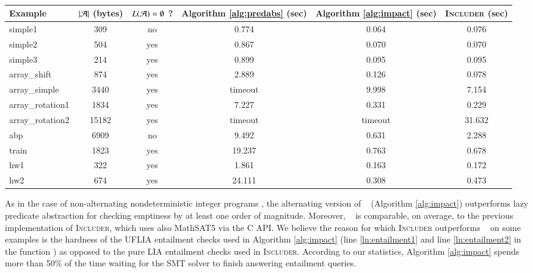 \documentclass[10pt]{llncs}
\begin{document}
\begin{table}[htb]
\vspace*{-\baselineskip}
\begin{center}
{\fontsize{8}{9}\selectfont
\begin{tabular}{||l|c|c|c|c|c||}
\hline
Example & ${|{\mathcal{A}}|}$ (bytes) & $L(\mathcal{A})=\emptyset$ ? & Algorithm \ref{alg:predabs} (sec) & Algorithm \ref{alg:impact} (sec) & \textsc{Includer} (sec) \\
\hline
simple1 & 309 & no & 0.774 & 0.064 & 0.076\\
\hline
simple2 & 504 & yes & 0.867 & 0.070 & 0.070\\
\hline
simple3 & 214 & yes & 0.899 & 0.095 & 0.095\\
\hline
array\_shift & 874 & yes & 2.889 & 0.126 & 0.078\\
\hline
array\_simple & 3440 & yes & timeout & 9.998 & 7.154\\
\hline
array\_rotation1 & 1834 & yes & 7.227 & 0.331 & 0.229\\
\hline
array\_rotation2 & 15182 & yes & timeout & timeout & 31.632\\
\hline
abp & 6909 & no & 9.492 & 0.631 & 2.288\\
\hline
train & 1823 & yes & 19.237 & 0.763 & 0.678\\
\hline
hw1 & 322 & yes & 1.861 & 0.163 & 0.172\\
\hline
hw2 & 674 & yes & 24.111 & 0.308 & 0.473\\
\hline
\end{tabular}
}
\caption{}\label{tab:experiments}
\end{center}
\vspace*{-2\baselineskip}
\end{table}

As in the case of non-alternating nondeterministic integer programs
\cite{mcmillan06}, the alternating version of \impact~ (Algorithm
\ref{alg:impact}) outperforms lazy predicate abstraction for checking
emptiness by at least one order of magnitude. Moreover, \impact~ is
comparable, on average, to the previous implementation of
\textsc{Includer}, which uses also MathSAT5 via the C API. We believe
the reason for which \textsc{Includer} outperforms \impact~ on some
examples is the hardness of the UFLIA entailment checks used in
Algorithm \ref{alg:impact} (line \ref{ln:entailment1} and line
\ref{ln:entailment2} in the function ) as opposed to the
pure LIA entailment checks used in \textsc{Includer}. According to our
statistics, Algorithm \ref{alg:impact} spends more than 50\% of the
time waiting for the SMT solver to finish answering entailment
queries.
\end{document}
